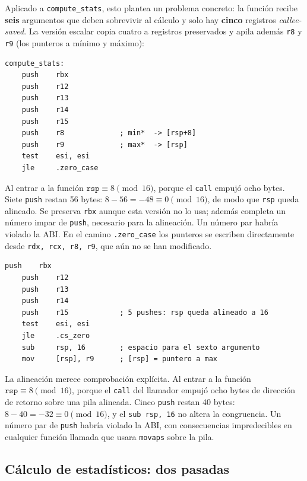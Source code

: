 \documentclass[journal]{IEEEtran}
\begin{document}
Aplicado a \texttt{compute\_stats}, esto plantea un problema concreto:
la función recibe \textbf{seis} argumentos que deben sobrevivir al
cálculo y solo hay \textbf{cinco} registros \textit{callee-saved}. La
versión escalar copia cuatro a registros preservados y apila además
\texttt{r8} y \texttt{r9} (los punteros a mínimo y máximo):

\begin{lstlisting}[caption={Prólogo escalar de \texttt{compute\_stats}:
  siete \texttt{push}.}, label={lst:prologo-esc}]
compute_stats:
    push    rbx
    push    r12
    push    r13
    push    r14
    push    r15
    push    r8             ; min*  -> [rsp+8]
    push    r9             ; max*  -> [rsp]
    test    esi, esi
    jle     .zero_case
\end{lstlisting}

Al entrar a la función $\texttt{rsp} \equiv 8 \pmod{16}$, porque el
\texttt{call} empujó ocho bytes. Siete \texttt{push} restan 56 bytes:
$8 - 56 = -48 \equiv 0 \pmod{16}$, de modo que \texttt{rsp} queda
alineado. Se preserva \texttt{rbx} aunque esta versión no lo usa;
además completa un número impar de \texttt{push}, necesario para la
alineación. Un número par habría violado la ABI. En el camino
\texttt{.zero\_case} los punteros se escriben directamente desde
\texttt{rdx, rcx, r8, r9}, que aún no se han modificado.

\begin{lstlisting}[caption={Prólogo de \texttt{compute\_stats}: cinco
  registros preservados y el sexto argumento en la pila.},
  label={lst:prologo}]
    push    rbx
    push    r12
    push    r13
    push    r14
    push    r15            ; 5 pushes: rsp queda alineado a 16
    test    esi, esi
    jle     .cs_zero
    sub     rsp, 16        ; espacio para el sexto argumento
    mov     [rsp], r9      ; [rsp] = puntero a max
\end{lstlisting}

La alineación merece comprobación explícita. Al entrar a la función
$\texttt{rsp} \equiv 8 \pmod{16}$, porque el \texttt{call} del llamador
empujó ocho bytes de dirección de retorno sobre una pila alineada.
Cinco \texttt{push} restan 40 bytes: $8 - 40 = -32 \equiv 0 \pmod{16}$, y
el \texttt{sub rsp, 16} no altera la congruencia. Un número par de
\texttt{push} habría violado la ABI, con consecuencias impredecibles en
cualquier función llamada que usara \texttt{movaps} sobre la pila.

\subsection{Cálculo de estadísticos: dos pasadas}
\end{document}
